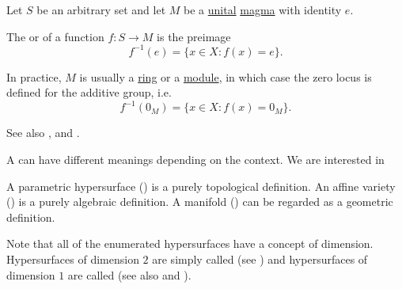 \begin{definition}\label{def:zero_locus}
  Let \( S \) be an arbitrary set and let \( M \) be a \hyperref[def:unital_magma]{unital} \hyperref[def:magma]{magma} with identity \( e \).

  The  or  of a function \( f: S \to M \) is the preimage
  \begin{equation*}
    f^{-1}(e) = \{ x \in X \colon f(x) = e \}.
  \end{equation*}

  In practice, \( M \) is usually a \hyperref[def:semiring/ring]{ring} or a \hyperref[def:left_module]{module}, in which case the zero locus is defined for the additive group, i.e.
  \begin{equation*}
    f^{-1}(0_M) = \{ x \in X \colon f(x) = 0_M \}.
  \end{equation*}

  See also ,  and .
\end{definition}

\begin{definition}\label{def:hypersurface}
  A  can have different meanings depending on the context. We are interested in

  \begin{defenum}
     A parametric hypersurface () is a purely topological definition.
     An affine variety () is a purely algebraic definition.
     A manifold () can be regarded as a geometric definition.
  \end{defenum}

  Note that all of the enumerated hypersurfaces have a concept of dimension. Hypersurfaces of dimension \( 2 \) are simply called  (see ) and hypersurfaces of dimension \( 1 \) are called  (see also  and ).
\end{definition}

